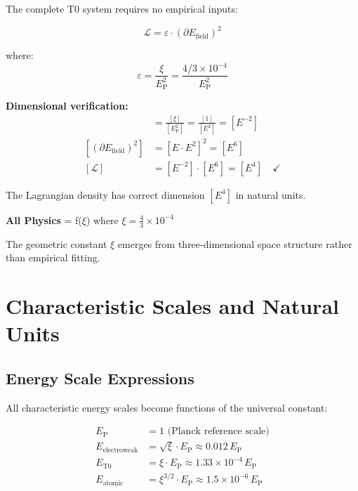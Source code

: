 \documentclass[12pt,a4paper]{report}
\newcommand{\EP}{E_{\text{P}}}            %
\begin{document}
The complete T0 system requires no empirical inputs:

\begin{equation}
	\boxed{\mathcal{L} = \varepsilon \cdot (\partial E_{\text{field}})^2}
\end{equation}

where:
\begin{equation}
	\varepsilon = \frac{\xi}{\EP^2} = \frac{4/3 \times 10^{-4}}{\EP^2}
\end{equation}

\textbf{Dimensional verification:}
\begin{align}
	[\varepsilon] &= \frac{[\xi]}{[\EP^2]} = \frac{[1]}{[E^2]} = [E^{-2}] \\
	[(\partial E_{\text{field}})^2] &= [E \cdot E^2]^2 = [E^6] \\
	[\mathcal{L}] &= [E^{-2}] \cdot [E^6] = [E^4] \quad \checkmark
\end{align}

The Lagrangian density has correct dimension $[E^4]$ in natural units.

\begin{tcolorbox}[colback=green!5!white,colframe=green!75!black,title=Parameter-Free Physics]
	\textbf{All Physics} = f($\xi$) where $\xi = \frac{4}{3} \times 10^{-4}$
	
	The geometric constant $\xi$ emerges from three-dimensional space structure rather than empirical fitting.
\end{tcolorbox}

\section{Characteristic Scales and Natural Units}
\label{sec:characteristic_scales}

\subsection{Energy Scale Expressions}
\label{subsec:energy_scale_expressions}

All characteristic energy scales become functions of the universal constant:

\begin{align}
	\EP &= 1 \text{ (Planck reference scale)} \\
	E_{\text{electroweak}} &= \sqrt{\xi} \cdot \EP \approx 0.012 \, \EP \\
	E_{\text{T0}} &= \xi \cdot \EP \approx 1.33 \times 10^{-4} \, \EP \\
	E_{\text{atomic}} &= \xi^{3/2} \cdot \EP \approx 1.5 \times 10^{-6} \, \EP
\end{align}
\end{document}
